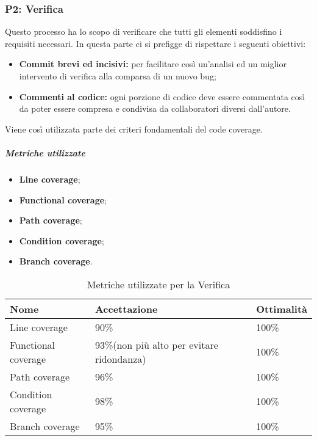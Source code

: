 \subsubsection{P2: Verifica}
Questo processo ha lo scopo di verificare che tutti gli elementi soddisfino i requisiti necessari. In questa parte ci si prefigge di rispettare i seguenti obiettivi:
\begin{itemize}
	\item{\textbf{Commit brevi ed incisivi:} per facilitare così un'analisi ed un miglior intervento di verifica alla comparsa di un nuovo bug;}
	\item{\textbf{Commenti al codice:} ogni porzione di codice deve essere commentata così da poter essere compresa e condivisa da collaboratori diversi dall'autore.}
\end{itemize}
Viene così utilizzata parte dei criteri fondamentali del code coverage\pedice.
\subparagraph{Metriche utilizzate}
\begin{itemize}
	\item{\textbf{Line coverage};}
	\item{\textbf{Functional coverage};}
	\item{\textbf{Path coverage};}
	\item{\textbf{Condition coverage};}
	\item{\textbf{Branch coverage}.}
\end{itemize}
\begin{table}[H]
	\centering
	\renewcommand{\arraystretch}{2} 
	\begin{tabular}{|l|l|l|}
		\rowcolor{orange!50}
		\hline
		\textbf{Nome} & \textbf{Accettazione} & \textbf{Ottimalità} \\
		\hline
		Line coverage & 90\% & 100\% \\
		\hline
		Functional coverage & 93\%(non più alto per evitare ridondanza) & 100\% \\
		\hline
		Path coverage & 96\% & 100\% \\
		\hline
		Condition coverage & 98\% & 100\% \\
		\hline
		Branch coverage & 95\% & 100\% \\
		\hline
	\end{tabular}
	\caption{Metriche utilizzate per la Verifica}
\end{table}
